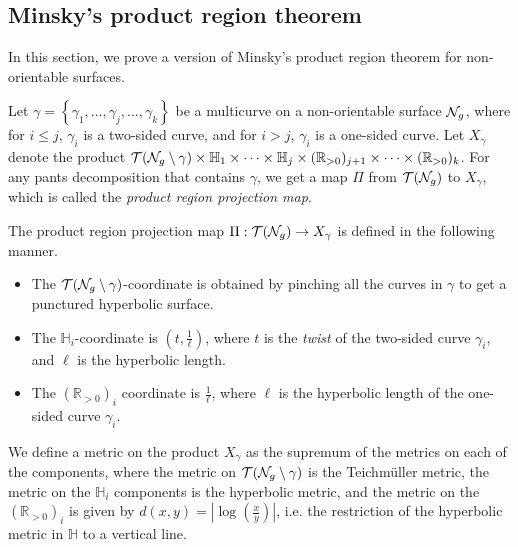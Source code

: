 \documentclass[12pt, reqno]{amsart}
\begin{document}

\subsection{Minsky's product region theorem}
\label{sec:minskys-prod-regi}

In this section, we prove a version of Minsky's product region theorem \cite[Theorem 6.1]{1077244446} for non-orientable surfaces.

Let $\gamma = \left\{ \gamma_1, \ldots, \gamma_j, \ldots, \gamma_k \right\}$ be a multicurve on a non-orientable surface $\mathcal{N}_g$, where for $i \leq j$, $\gamma_i$ is a two-sided curve, and for $i > j$, $\gamma_i$ is a one-sided curve.
Let $X_\gamma$ denote the product $\mathcal{T}(\mathcal{N}_g \setminus \gamma) \times \mathbb{H}_1 \times \cdots \times \mathbb{H}_j \times (\mathbb{R}_{>0})_{j+1} \times \cdots \times (\mathbb{R}_{>0})_k$.
For any pants decomposition that contains $\gamma$, we get a map $\Pi$ from $\mathcal{T}(\mathcal{N}_g)$ to $X_\gamma$, which is called the \emph{product region projection map}.
\begin{definition}
  The product region projection map $\Pi: \mathcal{T}(\mathcal{N}_g) \to X_\gamma$ is defined in the following manner.
  \begin{itemize}
  \item The $\mathcal{T}(\mathcal{N}_g \setminus \gamma)$-coordinate is obtained by pinching all the curves in $\gamma$ to get a punctured hyperbolic surface.
  \item The $\mathbb{H}_i$-coordinate is $\left( t, \frac{1}{\ell} \right)$, where $t$ is the \emph{twist} of the two-sided curve $\gamma_i$, and $\ell$ is the hyperbolic length.
  \item The $(\mathbb{R}_{>0})_i$ coordinate is $\frac{1}{\ell}$, where $\ell$ is the hyperbolic length of the one-sided curve $\gamma_i$.
  \end{itemize}
\end{definition}

We define a metric on the product $X_\gamma$ as the supremum of the metrics on each of the components, where the metric on $\mathcal{T}(\mathcal{N}_g \setminus \gamma)$ is the Teichmüller metric, the metric on the $\mathbb{H}_i$ components is the hyperbolic metric, and the metric on the $(\mathbb{R}_{>0})_i$ is given by $d(x,y) = \left| \log\left( \frac{x}{y}  \right) \right| $, i.e. the restriction of the hyperbolic metric in $\mathbb{H}$ to a vertical line.
\end{document}
